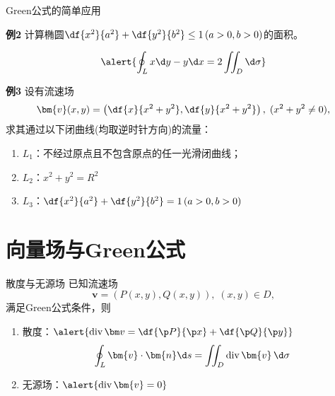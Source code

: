 
\begin{frame}{Green公式的简单应用}
	\linespread{1.2}
	\begin{exampleblock}{{\bf 例2}\hfill}
		计算椭圆$\df{x^2}{a^2}+\df{y^2}{b^2}\leq 1\,(a>0,b>0)$的面积。
	\end{exampleblock}
	\pause
	$$\alert{\oint_L x\d y-y\d x=2\iint_D\d\sigma}$$
\end{frame}

\begin{frame}
	\linespread{1.2}
	\begin{exampleblock}{{\bf 例3}\hfill}
		设有流速场
		$$\bm{v}(x,y)=\left(\df{x}{x^2+y^2},
		\df{y}{x^2+y^2}\right),\;(x^2+y^2\ne 0),$$
		求其通过以下闭曲线(均取逆时针方向)的流量：
		\begin{enumerate}
		  \item $L_1$：不经过原点且不包含原点的任一光滑闭曲线；
		  \item $L_2$：$x^2+y^2=R^2$
		  \item $L_3$：$\df{x^2}{a^2}+\df{y^2}{b^2}=1\,(a>0,b>0)$
		\end{enumerate}
	\end{exampleblock}
\end{frame}

\section{向量场与Green公式}

\begin{frame}{散度与无源场}
	\linespread{1.2}\pause 
		已知流速场
		$$\bm{v}=(P(x,y),Q(x,y)),\;(x,y)\in D,$$
		满足Green公式条件\pause ，则
		\begin{enumerate}
		  \item {\bb 散度：}$\alert{\mathrm{div}\,\bm v=\df{\p P}{\p x}+\df{\p Q}{\p
		  y}}$\pause 
		  $$\oint_L\bm{v}\cdot\bm{n}\d
		  s=\iint_D\mathrm{div}\,\bm{v}\,\d\sigma$$\pause
		  \vspace{-1em}
		  \item {\bb 无源场：}$\alert{\mathrm{div}\,\bm{v}=0}$
		\end{enumerate}
\end{frame}

